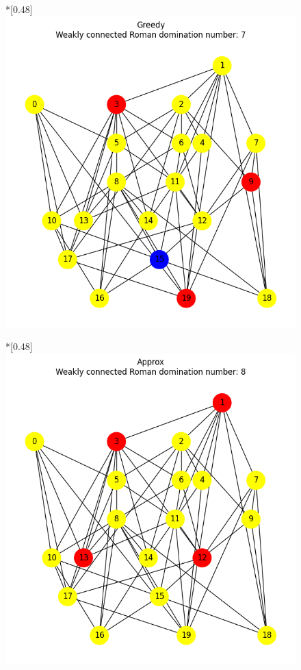 \begin{figure}[H]
\begin{subcaptionbox}
        \end{subcaptionbox}
        \hfill
        \begin{subcaptionbox}*{}[0.48\linewidth]
            {\includegraphics[width=0.75\linewidth]{assets/plots/Greedy/ErdosRenyi_sparse_n20_i2_results.png}}
        \end{subcaptionbox}
        \hfill
        \begin{subcaptionbox}*{}[0.48\linewidth]
            {\includegraphics[width=0.75\linewidth]{assets/plots/Approx/ErdosRenyi_sparse_n20_i2_results.png}}
        \end{subcaptionbox}

\end{figure}
